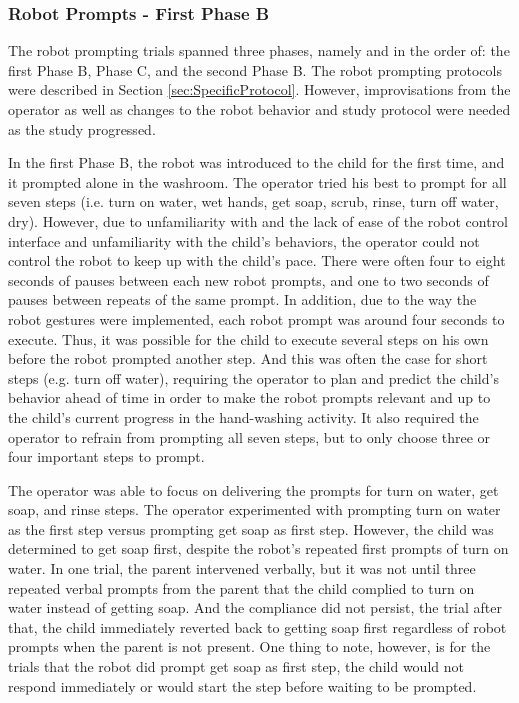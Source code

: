 \subsubsection{Robot Prompts - First Phase B}
The robot prompting trials spanned three phases, namely and in the order of: the first Phase B, Phase C, and the second Phase B.  The robot prompting protocols were described in Section \ref{sec:SpecificProtocol}.  However, improvisations from the operator as well as changes to the robot behavior and study protocol were needed as the study progressed.

In the first Phase B, the robot was introduced to the child for the first time, and it prompted alone in the washroom.  The operator tried his best to prompt for all seven steps (i.e. turn on water, wet hands, get soap, scrub, rinse, turn off water, dry).  However, due to unfamiliarity with and the lack of ease of the robot control interface and unfamiliarity with the child's behaviors, the operator could not control the robot to keep up with the child's pace.  There were often four to eight seconds of pauses between each new robot prompts, and one to two seconds of pauses between repeats of the same prompt.  In addition, due to the way the robot gestures were implemented, each robot prompt was around four seconds to execute.  Thus, it was possible for the child to execute several steps on his own before the robot prompted another step.  And this was often the case for short steps (e.g. turn off water), requiring the operator to plan and predict the child's behavior ahead of time in order to make the robot prompts relevant and up to the child's current progress in the hand-washing activity.  It also required the operator to refrain from prompting all seven steps, but to only choose three or four important steps to prompt.

The operator was able to focus on delivering the prompts for turn on water, get soap, and rinse steps.  The operator experimented with prompting turn on water as the first step versus prompting get soap as first step.  However, the child was determined to get soap first, despite the robot's repeated first prompts of turn on water.  In one trial, the parent intervened verbally, but it was not until three repeated verbal prompts from the parent that the child complied to turn on water instead of getting soap.  And the compliance did not persist, the trial after that, the child immediately reverted back to getting soap first regardless of robot prompts when the parent is not present.  One thing to note, however, is for the trials that the robot did prompt get soap as first step, the child would not respond immediately or would start the step before waiting to be prompted.

